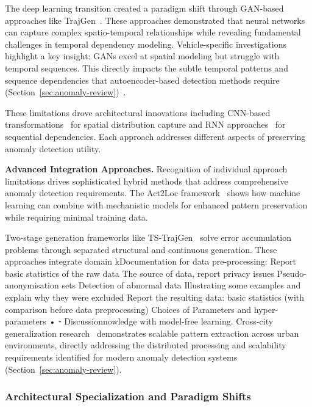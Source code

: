 \documentclass[runningheads]{llncs}
\begin{document}
The deep learning transition created a paradigm shift through GAN-based approaches like TrajGen~\cite{cao2021generating}. These approaches demonstrated that neural networks can capture complex spatio-temporal relationships while revealing fundamental challenges in temporal dependency modeling. Vehicle-specific investigations~\cite{bajarunas2022generative} highlight a key insight: GANs excel at spatial modeling but struggle with temporal sequences. This directly impacts the subtle temporal patterns and sequence dependencies that autoencoder-based detection methods require (Section~\ref{sec:anomaly-review})~\cite{huang2021lstm}.

These limitations drove architectural innovations including CNN-based transformations~\cite{merhi2024synthetic} for spatial distribution capture and RNN approaches~\cite{du2016recurrent} for sequential dependencies. Each approach addresses different aspects of preserving anomaly detection utility.

\textbf{Advanced Integration Approaches.} Recognition of individual approach limitations drives sophisticated hybrid methods that address comprehensive anomaly detection requirements. The Act2Loc framework~\cite{liu2023act2loc} shows how machine learning can combine with mechanistic models for enhanced pattern preservation while requiring minimal training data.

Two-stage generation frameworks like TS-TrajGen~\cite{jiang2023continuous} solve error accumulation problems through separated structural and continuous generation. These approaches integrate domain kDocumentation for data pre-processing:
Report basic statistics of the raw data
The source of data, report privacy issues
Pseudo-anonymisation sets
Detection of abnormal data
Illustrating some examples and explain why they were excluded
Report the resulting data: basic statistics (with comparison before data preprocessing)
Choices of Parameters and hyper-parameters
	•		⁃	Discussionnowledge with model-free learning. Cross-city generalization research~\cite{wang2025gtg} demonstrates scalable pattern extraction across urban environments, directly addressing the distributed processing and scalability requirements identified for modern anomaly detection systems (Section~\ref{sec:anomaly-review}).

\subsubsection{Architectural Specialization and Paradigm Shifts}
\end{document}
